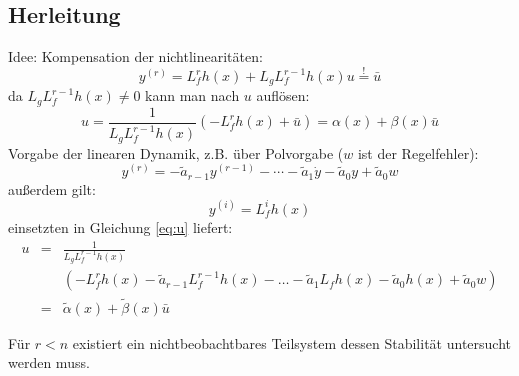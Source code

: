 \subsection{Herleitung}
Idee: Kompensation der nichtlinearitäten:
\begin{equation}
    y^{(r)} = L_f^r h(x) + L_g L_f^{r-1} h(x) u \stackrel{!}{=} \bar{u}
\end{equation}
da $L_g L_f^{r-1} h(x) \neq 0$ kann man nach $u$ auflösen:
\begin{equation} \label{eq:u}
    u = \frac{1}{L_g L_f^{r-1} h(x)} \left(-L_f^r h(x) + \bar{u} \right)
      = \alpha(x) + \beta(x) \bar{u}
\end{equation}
Vorgabe der linearen Dynamik, z.B. über Polvorgabe ($w$ ist der Regelfehler):
\begin{equation}
    y^{(r)} = - \tilde{a}_{r-1} y^{(r-1)} - \cdots - \tilde{a}_1 \dot{y} - \tilde{a}_0 y +
        \tilde{a}_0 w
\end{equation}
außerdem gilt:
\begin{equation}
    y^{(i)} = L_f^i h(x)
\end{equation}
einsetzten in Gleichung \ref{eq:u} liefert:
\begin{eqnarray}
    u &=& \frac{1}{L_g L_f^{r-1} h(x)} \\
        &&\left(-L_f^r h(x) - \tilde{a}_{r-1} L_f^{r-1} h(x) - \ldots - \tilde{a}_1 L_f h(x) - \tilde{a}_0 h(x) + \tilde{a}_0 w \right) \\
      &=& \tilde{\alpha}(x) + \tilde{\beta}(x) \bar{u}
\end{eqnarray}

Für $r<n$ existiert ein nichtbeobachtbares Teilsystem dessen Stabilität untersucht werden
muss.
